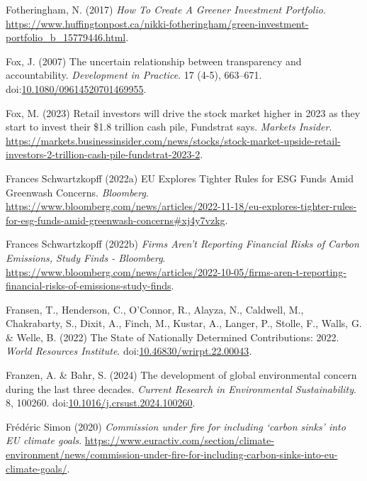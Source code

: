 \documentclass[
  letterpaper,
  DIV=11,
  numbers=noendperiod]{scrartcl}
\newlength{\cslhangindent}
\newenvironment{CSLReferences}[2] %
 {\begin{list}{}{%
  \setlength{\itemindent}{0pt}
  \setlength{\leftmargin}{0pt}
  \setlength{\parsep}{0pt}
  \ifodd #1
   \setlength{\leftmargin}{\cslhangindent}
   \setlength{\itemindent}{-1\cslhangindent}
  \fi
  \setlength{\itemsep}{#2\baselineskip}}}
 {\end{list}}
\begin{document}
\begin{CSLReferences}{0}{1}
Fotheringham, N. (2017) \emph{How {To Create A Greener Investment
Portfolio}}.
\url{https://www.huffingtonpost.ca/nikki-fotheringham/green-investment-portfolio_b_15779446.html}.

Fox, J. (2007) The uncertain relationship between transparency and
accountability. \emph{Development in Practice}. 17 (4-5), 663--671.
doi:\href{https://doi.org/10.1080/09614520701469955}{10.1080/09614520701469955}.

Fox, M. (2023) Retail investors will drive the stock market higher in
2023 as they start to invest their \$1.8 trillion cash pile, {Fundstrat}
says. \emph{Markets Insider}.
\url{https://markets.businessinsider.com/news/stocks/stock-market-upside-retail-investors-2-trillion-cash-pile-fundstrat-2023-2}.

Frances Schwartzkopff (2022a) {EU Explores Tighter Rules} for {ESG Funds
Amid Greenwash Concerns}. \emph{Bloomberg}.
\url{https://www.bloomberg.com/news/articles/2022-11-18/eu-explores-tighter-rules-for-esg-funds-amid-greenwash-concerns\#xj4y7vzkg}.

Frances Schwartzkopff (2022b) \emph{Firms {Aren}'t {Reporting Financial
Risks} of {Carbon Emissions}, {Study Finds} - {Bloomberg}}.
\url{https://www.bloomberg.com/news/articles/2022-10-05/firms-aren-t-reporting-financial-risks-of-emissions-study-finds}.

Fransen, T., Henderson, C., O'Connor, R., Alayza, N., Caldwell, M.,
Chakrabarty, S., Dixit, A., Finch, M., Kustar, A., Langer, P., Stolle,
F., Walls, G. \& Welle, B. (2022) The {State} of {Nationally Determined
Contributions}: 2022. \emph{World Resources Institute}.
doi:\href{https://doi.org/10.46830/wrirpt.22.00043}{10.46830/wrirpt.22.00043}.

Franzen, A. \& Bahr, S. (2024) The development of global environmental
concern during the last three decades. \emph{Current Research in
Environmental Sustainability}. 8, 100260.
doi:\href{https://doi.org/10.1016/j.crsust.2024.100260}{10.1016/j.crsust.2024.100260}.

Frédéric Simon (2020) \emph{Commission under fire for including {`carbon
sinks'} into {EU} climate goals}.
\url{https://www.euractiv.com/section/climate-environment/news/commission-under-fire-for-including-carbon-sinks-into-eu-climate-goals/}.


\end{CSLReferences}
\end{document}
